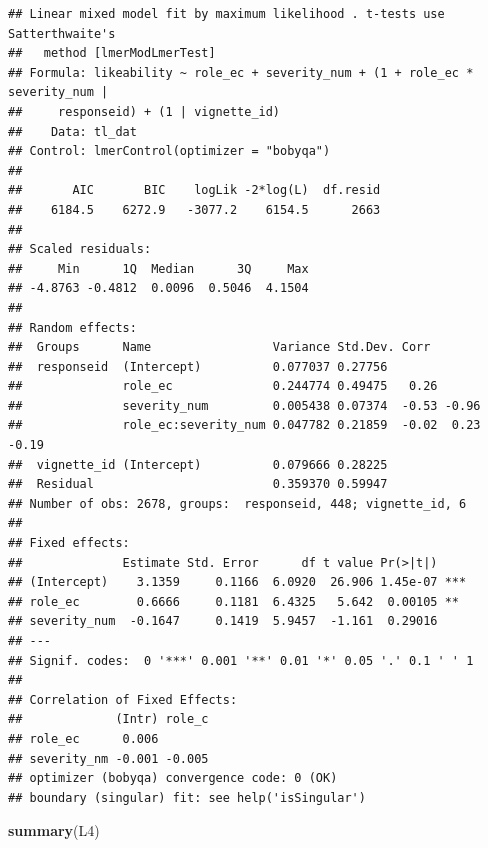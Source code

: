 \documentclass[
]{article}
\newenvironment{Shaded}{\begin{snugshade}}{\end{snugshade}}
\newcommand{\FunctionTok}[1]{\textcolor[rgb]{0.13,0.29,0.53}{\textbf{#1}}}
\newcommand{\NormalTok}[1]{#1}
\begin{document}
\begin{verbatim}
## Linear mixed model fit by maximum likelihood . t-tests use Satterthwaite's
##   method [lmerModLmerTest]
## Formula: likeability ~ role_ec + severity_num + (1 + role_ec * severity_num |  
##     responseid) + (1 | vignette_id)
##    Data: tl_dat
## Control: lmerControl(optimizer = "bobyqa")
## 
##       AIC       BIC    logLik -2*log(L)  df.resid 
##    6184.5    6272.9   -3077.2    6154.5      2663 
## 
## Scaled residuals: 
##     Min      1Q  Median      3Q     Max 
## -4.8763 -0.4812  0.0096  0.5046  4.1504 
## 
## Random effects:
##  Groups      Name                 Variance Std.Dev. Corr             
##  responseid  (Intercept)          0.077037 0.27756                   
##              role_ec              0.244774 0.49475   0.26            
##              severity_num         0.005438 0.07374  -0.53 -0.96      
##              role_ec:severity_num 0.047782 0.21859  -0.02  0.23 -0.19
##  vignette_id (Intercept)          0.079666 0.28225                   
##  Residual                         0.359370 0.59947                   
## Number of obs: 2678, groups:  responseid, 448; vignette_id, 6
## 
## Fixed effects:
##              Estimate Std. Error      df t value Pr(>|t|)    
## (Intercept)    3.1359     0.1166  6.0920  26.906 1.45e-07 ***
## role_ec        0.6666     0.1181  6.4325   5.642  0.00105 ** 
## severity_num  -0.1647     0.1419  5.9457  -1.161  0.29016    
## ---
## Signif. codes:  0 '***' 0.001 '**' 0.01 '*' 0.05 '.' 0.1 ' ' 1
## 
## Correlation of Fixed Effects:
##             (Intr) role_c
## role_ec      0.006       
## severity_nm -0.001 -0.005
## optimizer (bobyqa) convergence code: 0 (OK)
## boundary (singular) fit: see help('isSingular')
\end{verbatim}

\begin{Shaded}
\begin{Highlighting}[]
\FunctionTok{summary}\NormalTok{(L4)}
\end{Highlighting}
\end{Shaded}
\end{document}
